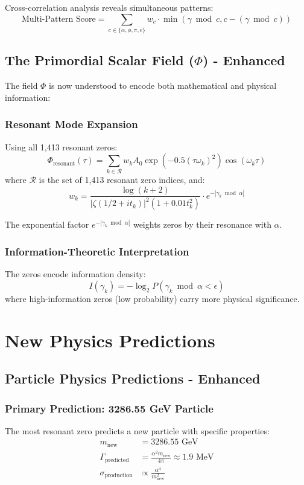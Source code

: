 \documentclass[12pt, a4paper]{article}
\begin{document}
Cross-correlation analysis reveals simultaneous patterns:
\begin{equation}
\text{Multi-Pattern Score} = \sum_{c \in \{\alpha, \phi, \pi, e\}} w_c \cdot \min(\gamma \bmod c, c - (\gamma \bmod c))
\end{equation}

\subsection{The Primordial Scalar Field ($\Phi$) - Enhanced}
The field $\Phi$ is now understood to encode both mathematical and physical information:

\subsubsection{Resonant Mode Expansion}
Using all 1,413 resonant zeros:
\begin{equation}
\Phi_{\text{resonant}}(\tau) = \sum_{k \in \mathcal{R}} w_k A_0 \exp(-0.5 (\tau \omega_k)^2) \cos(\omega_k \tau)
\end{equation}
where $\mathcal{R}$ is the set of 1,413 resonant zero indices, and:
\begin{equation}
w_k = \frac{\log(k+2)}{|\zeta(1/2 + i t_k)|^2 (1 + 0.01 t_k^2)} \cdot e^{-|\gamma_k \bmod \alpha|}
\end{equation}

The exponential factor $e^{-|\gamma_k \bmod \alpha|}$ weights zeros by their resonance with $\alpha$.

\subsubsection{Information-Theoretic Interpretation}
The zeros encode information density:
\begin{equation}
I(\gamma_k) = -\log_2 P(\gamma_k \bmod \alpha < \epsilon)
\end{equation}
where high-information zeros (low probability) carry more physical significance.

\section{New Physics Predictions}

\subsection{Particle Physics Predictions - Enhanced}
\subsubsection{Primary Prediction: 3286.55 GeV Particle}
The most resonant zero predicts a new particle with specific properties:
\begin{align}
m_{\text{new}} &= 3286.55 \text{ GeV} \\
\Gamma_{\text{predicted}} &= \frac{\alpha^2 m_{\text{new}}}{4\pi} \approx 1.9 \text{ MeV} \\
\sigma_{\text{production}} &\propto \frac{\alpha^4}{m_{\text{new}}^2}
\end{align}
\end{document}
